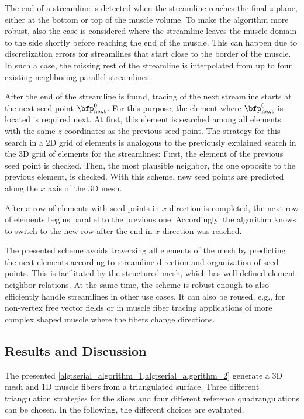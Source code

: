 The end of a streamline is detected when the streamline reaches the final $z$ plane, either at the bottom or top of the muscle volume. To make the algorithm more robust, also the case is considered where the streamline leaves the muscle domain to the side shortly before reaching the end of the muscle. This can happen due to discretization errors for streamlines that start close to the border of the muscle. In such a case, the missing rest of the streamline is interpolated from up to four existing neighboring parallel streamlines.

After the end of the streamline is found, tracing of the next streamline starts at the next seed point $\bfp^0_\text{next}$. For this purpose, the element where $\bfp^0_\text{next}$ is located is required next. At first, this element is searched among all elements with the same $z$ coordinates as the previous seed point. The strategy for this search in a 2D grid of elements is analogous to the previously explained search in the 3D grid of elements for the streamlines: First, the element of the previous seed point is checked. Then, the most plausible neighbor, the one opposite to the previous element, is checked. With this scheme, new seed points are predicted along the $x$ axis of the 3D mesh.

After a row of elements with seed points in $x$ direction is completed, the next row of elements begins parallel to the previous one. Accordingly, the algorithm knows to switch to the new row after the end in $x$ direction was reached.

The presented scheme avoids traversing all elements of the mesh by predicting the next elements according to streamline direction and organization of seed points. This is facilitated by the structured mesh, which has well-defined element neighbor relations.
At the same time, the scheme is robust enough to also efficiently handle streamlines in other use cases. It can also be reused, e.g., for non-vertex free vector fields or in muscle fiber tracing applications of more complex shaped muscle where the fibers change directions.

\subsection{Results and Discussion}\label{sec:mesh_generation_0_results_and_discussion}
The presented \cref{alg:serial_algorithm_1,alg:serial_algorithm_2} generate a 3D mesh and 1D muscle fibers from a triangulated surface. Three different triangulation strategies for the slices and four different reference quadrangulations can be chosen. In the following, the different choices are evaluated.

